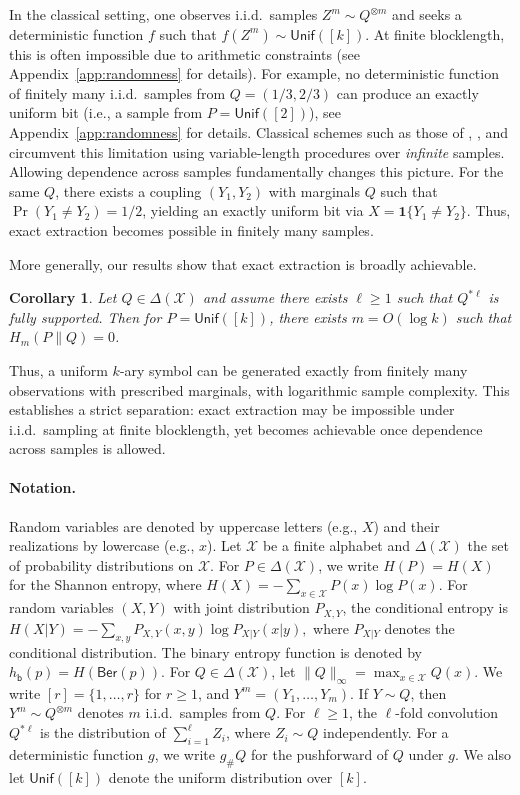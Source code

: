 \documentclass[journal]{IEEEtran}
\newtheorem{corollary}{Corollary}
\def\calX{{\mathcal X}}
\newcommand{\1}{\mathbf{1}}
\newcommand{\Ber}{\mathsf{Ber}}
\newcommand{\Unif}{\mathsf{Unif}}
\begin{document}
In the classical setting, one observes i.i.d.\ samples $Z^m\sim Q^{\otimes m}$ and seeks a deterministic function $f$ such that $f(Z^m)\sim \Unif([k])$. At finite blocklength, this is often impossible due to arithmetic constraints (see Appendix~\ref{app:randomness} for details). For example, no deterministic function of finitely many i.i.d.\ samples from $Q=(1/3,2/3)$ can produce an exactly uniform bit (i.e., a sample from $P=\Unif([2])$), see Appendix~\ref{app:randomness} for details.  Classical schemes such as those of \cite{vonNeumann1951RandomDigits}, \cite{Elias1972Unbiased}, and \cite{Peres1992Iterating} circumvent this limitation using variable-length procedures over \textit{infinite} samples. 
Allowing dependence across samples fundamentally changes this picture. For the same $Q$, there exists a coupling $(Y_1,Y_2)$ with marginals $Q$ such that $\Pr(Y_1\neq Y_2)=1/2$, yielding an exactly uniform bit via $X=\mathbf{1}\{Y_1\neq Y_2\}$. Thus, exact extraction becomes possible in finitely many samples.

More generally, our results show that exact extraction is broadly achievable.

\begin{corollary}\label{cor:extraction}
Let $Q\in\Delta(\calX)$ and assume there exists $\ell\ge1$ such that $Q^{*\ell}$ is fully supported. Then for $P=\Unif([k])$, there exists $m=O(\log k)$ such that $H_m(P\|Q)=0$.
\end{corollary}

Thus, a uniform $k$-ary symbol can be generated exactly from finitely many observations with prescribed marginals, with logarithmic sample complexity. This establishes a strict separation: exact extraction may be impossible under i.i.d.\ sampling at finite blocklength, yet becomes achievable once dependence across samples is allowed.



\paragraph{Notation.}
Random variables are denoted by uppercase letters (e.g., $X$) and their realizations by lowercase (e.g., $x$). Let $\calX$ be a finite alphabet and $\Delta(\calX)$ the set of probability distributions on $\calX$. For $P\in\Delta(\calX)$, we write $H(P)=H(X)$ for the Shannon entropy, where
$H(X) = -\sum_{x\in \calX} P(x)\log P(x).$
For random variables $(X,Y)$ with joint distribution $P_{X,Y}$, the conditional entropy is
$H(X|Y) = -\sum_{x,y} P_{X,Y}(x,y)\log P_{X|Y}(x|y),$
where $P_{X|Y}$ denotes the conditional distribution. The binary entropy function is denoted by $h_{\mathsf b}(p)=H(\Ber(p))$.
For $Q\in\Delta(\calX)$, let $\|Q\|_\infty=\max_{x\in\calX}Q(x)$. We write $[r]=\{1,\dots,r\}$ for $r\ge1$, and $Y^m=(Y_1,\dots,Y_m)$. If $Y\sim Q$, then $Y^m\sim Q^{\otimes m}$ denotes $m$ i.i.d.\ samples from $Q$.
For $\ell\ge1$, the $\ell$-fold convolution $Q^{*\ell}$ is the distribution of $\sum_{i=1}^\ell Z_i$, where $Z_i\sim Q$ independently. For a deterministic function $g$, we write $g_{\#}Q$ for the pushforward of $Q$ under $g$. We also let $\Unif([k])$ denote the uniform distribution over $[k]$.
\end{document}
